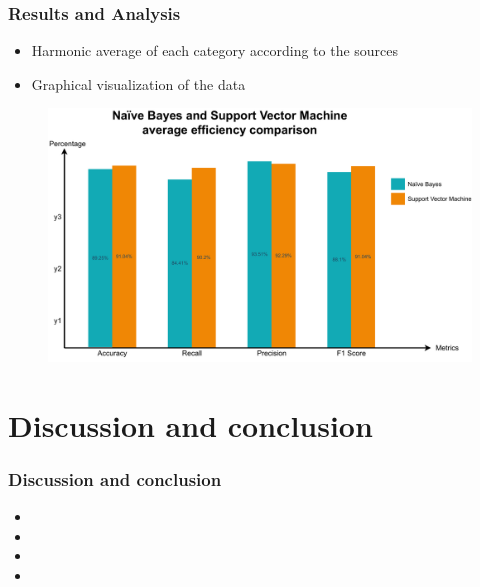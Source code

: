 \documentclass{beamer}
\begin{document}
\begin{frame}[fragile=singleslide]\frametitle{Results and Analysis}
\begin{itemize}[label = $\bullet$]
\item Harmonic average of each category according to the sources
\item Graphical visualization of the data
\end{itemize}
\begin{figure}
\centering
\includegraphics[scale=.35]{average.pdf}
\end{figure}
\end{frame}

\section{Discussion and conclusion}

\begin{frame}[fragile=singleslide]\frametitle{Discussion and conclusion}
\begin{itemize}[label=$\bullet$]
\item {}
\item {}
\item {}
\item {}
\end{itemize}
\end{frame}



\end{document}
